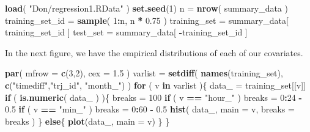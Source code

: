 \documentclass[]{article}
\newenvironment{Shaded}{\begin{snugshade}}{\end{snugshade}}
\newcommand{\ControlFlowTok}[1]{\textcolor[rgb]{0.13,0.29,0.53}{\textbf{#1}}}
\newcommand{\DataTypeTok}[1]{\textcolor[rgb]{0.13,0.29,0.53}{#1}}
\newcommand{\DecValTok}[1]{\textcolor[rgb]{0.00,0.00,0.81}{#1}}
\newcommand{\FloatTok}[1]{\textcolor[rgb]{0.00,0.00,0.81}{#1}}
\newcommand{\KeywordTok}[1]{\textcolor[rgb]{0.13,0.29,0.53}{\textbf{#1}}}
\newcommand{\NormalTok}[1]{#1}
\newcommand{\OperatorTok}[1]{\textcolor[rgb]{0.81,0.36,0.00}{\textbf{#1}}}
\newcommand{\StringTok}[1]{\textcolor[rgb]{0.31,0.60,0.02}{#1}}
\begin{document}
\begin{Shaded}
\begin{Highlighting}[]
\KeywordTok{load}\NormalTok{( }\StringTok{"Don/regression1.RData"}\NormalTok{ )}
\KeywordTok{set.seed}\NormalTok{(}\DecValTok{1}\NormalTok{)}
\NormalTok{n =}\StringTok{ }\KeywordTok{nrow}\NormalTok{( summary_data )}
\NormalTok{training_set_id =}\StringTok{ }\KeywordTok{sample}\NormalTok{( }\DecValTok{1}\OperatorTok{:}\NormalTok{n, n }\OperatorTok{*}\StringTok{ }\FloatTok{0.75}\NormalTok{ )}
\NormalTok{training_set =}\StringTok{ }\NormalTok{summary_data[ training_set_id ]}
\NormalTok{test_set =}\StringTok{ }\NormalTok{summary_data[ }\OperatorTok{-}\NormalTok{training_set_id ]}
\end{Highlighting}
\end{Shaded}

In the next figure, we have the empirical distributions of each of our
covariates.

\begin{Shaded}
\begin{Highlighting}[]
\KeywordTok{par}\NormalTok{( }\DataTypeTok{mfrow =} \KeywordTok{c}\NormalTok{(}\DecValTok{3}\NormalTok{,}\DecValTok{2}\NormalTok{), }\DataTypeTok{cex =} \FloatTok{1.5}\NormalTok{ )}
\NormalTok{varlist =}\StringTok{ }\KeywordTok{setdiff}\NormalTok{( }\KeywordTok{names}\NormalTok{(training_set), }\KeywordTok{c}\NormalTok{(}\StringTok{"timediff"}\NormalTok{,}\StringTok{"trj_id"}\NormalTok{, }\StringTok{"month_"}\NormalTok{) )}
\ControlFlowTok{for}\NormalTok{ ( v }\ControlFlowTok{in}\NormalTok{ varlist )\{}
\NormalTok{    data_ =}\StringTok{ }\NormalTok{training_set[[v]]}
    \ControlFlowTok{if}\NormalTok{ ( }\KeywordTok{is.numeric}\NormalTok{( data_ ) )\{}
\NormalTok{        breaks =}\StringTok{ }\DecValTok{100}
        \ControlFlowTok{if}\NormalTok{ ( v }\OperatorTok{==}\StringTok{ "hour_"}\NormalTok{ ) breaks =}\StringTok{ }\DecValTok{0}\OperatorTok{:}\DecValTok{24} \OperatorTok{-}\StringTok{ }\FloatTok{0.5}
        \ControlFlowTok{if}\NormalTok{ ( v }\OperatorTok{==}\StringTok{ "min_"}\NormalTok{ ) breaks =}\StringTok{ }\DecValTok{0}\OperatorTok{:}\DecValTok{60} \OperatorTok{-}\StringTok{ }\FloatTok{0.5}
        \KeywordTok{hist}\NormalTok{( data_, }\DataTypeTok{main =}\NormalTok{ v, }\DataTypeTok{breaks =}\NormalTok{ breaks )}
\NormalTok{    \} }\ControlFlowTok{else}\NormalTok{\{}
        \KeywordTok{plot}\NormalTok{(data_, }\DataTypeTok{main =}\NormalTok{ v)}
\NormalTok{    \}}
\NormalTok{\}}
\end{Highlighting}
\end{Shaded}
\end{document}
